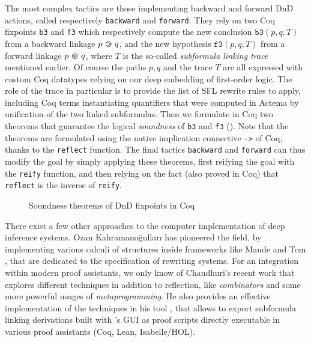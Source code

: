 The most complex tactics are those implementing backward and forward DnD
actions, called respectively \texttt{backward} and \texttt{forward}. They rely
on two Coq fixpoints \texttt{b3} and \texttt{f3} which respectively compute the
new conclusion $\mathtt{b3}(p, q, T)$ from a backward linkage $p \operatorname{\,\varogreaterthan\,} q$, and
the new hypothesis $\mathtt{f3}(p, q, T)$ from a forward linkage $p \operatorname{\,\varoast\,} q$,
where $T$ is the so-called \emph{subformula linking trace} mentioned earlier. Of
course the paths $p, q$ and the trace $T$ are all expressed with custom Coq
datatypes relying on our deep embedding of first-order logic. The role of the
trace in particular is to provide the list of SFL rewrite rules to apply,
including Coq terms instantiating quantifiers that were computed in Actema by
unification of the two linked subformulas. Then we formulate in Coq two theorems
that guarantee the logical \emph{soundness} of \texttt{b3} and \texttt{f3}
(). Note that the theorems are formulated using the native
implication connective \texttt{->} of Coq, thanks to the \texttt{reflect}
function. The final tactics \texttt{backward} and \texttt{forward} can thus
modify the goal by simply applying these theorems, first reifying the goal with
the \texttt{reify} function, and then relying on the fact (also proved in Coq)
that \texttt{reflect} is the inverse of \texttt{reify}.

\begin{figure}
  
  \caption{Soundness theorems of DnD fixpoints in Coq}
\end{figure}


\begin{remark}
  There exist a few other approaches to the computer implementation of deep
  inference systems. Ozan Kahramanoğulları has pioneered the field, by
  implementing various calculi of structures inside frameworks like Maude
  \cite{kahramanogullari_maude_2008} and Tom
  \cite{kahramanogullari_implementing_2005}, that are dedicated to the
  specification of rewriting systems. For an integration within modern proof
  assistants, we only know of Chaudhuri's recent work
   that explores different techniques in
  addition to reflection, like \emph{combinators} and some more powerful usages
  of \emph{metaprogramming}. He also provides an effective implementation of the
  techniques in his  tool \cite{DBLP:conf/cade/Chaudhuri21}, that
  allows to export subformula linking derivations built with 's GUI
  as proof scripts directly executable in various proof assistants (Coq, Lean,
  Isabelle/HOL).
\end{remark}

